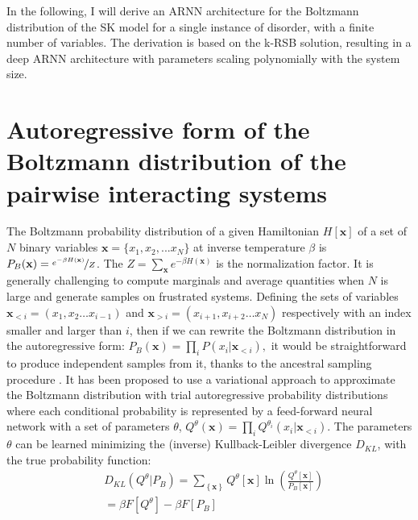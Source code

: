 \documentclass[aps,physrev,10pt,floatfix,reprint]{revtex4-2}
\begin{document}
In the following, I will derive an ARNN architecture for the Boltzmann distribution of the SK model for a single instance of disorder, with a finite number of variables. The derivation is based on the k-RSB solution, resulting in a deep ARNN architecture with parameters scaling polynomially with the system size. \\
            
\section{Autoregressive form of the Boltzmann distribution of the pairwise interacting systems}
\label{sec:ARNN_boltzmann}
The Boltzmann probability distribution of a given Hamiltonian $H[\mathbf{x}]$ of a set of $N$ binary variables $\mathbf{x}=\{x_1, x_2,...x_N\}$ at inverse temperature $\beta$ is $P_{B}(\mathbf{x}) = \nicefrac{e^{-\beta H\left(\mathbf{x}\right)}}{Z}$. The $Z=\sum_{\mathbf{x}}e^{-\beta H\left(\mathbf{x}\right)}$ is the normalization factor.
It is generally challenging to compute marginals and average quantities when $N$ is large and generate samples on frustrated systems. Defining the sets of variables $\mathbf{x}_{<i}=\left(x_{1},x_{2}\dots x_{i-1}\right)$ and $\mathbf{x}_{>i}=\left(x_{i+1},x_{i+2}\dots x_{N}\right)$ respectively with an index smaller and larger than $i$, then if we can rewrite the Boltzmann distribution in the autoregressive form:
$
P_{B}\left(\mathbf{x}\right)=\prod_{i}P\left(x_{i}|\mathbf{x}_{<i}\right),
$
it would be straightforward to produce independent samples from it, thanks to the ancestral sampling procedure \cite{Wu2019}. It has been proposed \cite{Wu2019} to use a variational approach to approximate the Boltzmann distribution with trial autoregressive probability distributions where each conditional probability is represented by a feed-forward neural network with a set of parameters ${\theta}$,
$
Q^{\theta}\left(\mathbf{x}\right)=\prod_{i}Q^{\theta_i}\left(x_{i}|\mathbf{x}_{<i}\right)
$.
The parameters ${\theta}$ can be learned minimizing the (inverse) Kullback-Leibler divergence $D_{KL}$,
with the true probability function:
\begin{equation}
\begin{split}
& D_{KL}\left(Q^{\theta}| P_{B}\right) =  \sum_{\left\{ \mathbf{x} \right\} } Q^{\theta} [\mathbf{x}]\ln\left(\frac{Q^{\theta}[\mathbf{x}]}{P_{B}[\mathbf{x}]}\right)  \\
& = \beta F[Q^{\theta}] - \beta F[P_{B}]\\
\end{split}
\label{eq:kl}    
\end{equation}
\end{document}

